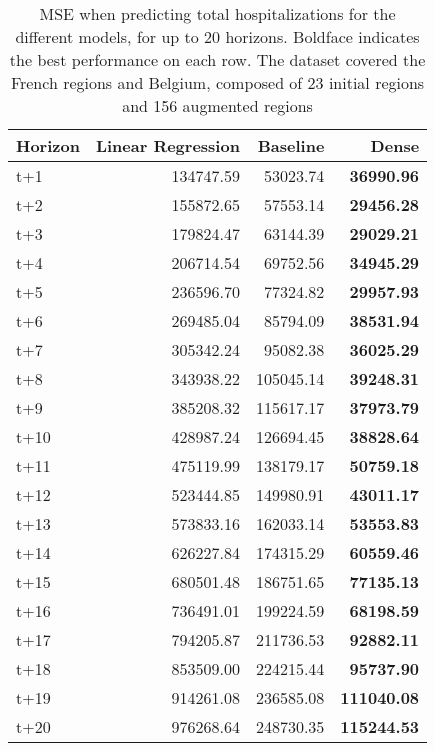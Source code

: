 \begin{table}[H]
\centering
\caption{MSE when predicting total hospitalizations for the different models, for up to 20 horizons. Boldface indicates the best performance on each row. The dataset covered the French regions and Belgium, composed of 23 initial regions and 156 augmented regions }
\label{tab:MSE_comparison}
\begin{tabular}{lrrr}
\toprule
Horizon &  Linear Regression &  Baseline &     Dense \\
\midrule
t+1  & 134747.59  & 53023.74  & \textbf{36990.96}  \\
t+2  & 155872.65  & 57553.14  & \textbf{29456.28}  \\
t+3  & 179824.47  & 63144.39  & \textbf{29029.21}  \\
t+4  & 206714.54  & 69752.56  & \textbf{34945.29}  \\
t+5  & 236596.70  & 77324.82  & \textbf{29957.93}  \\
t+6  & 269485.04  & 85794.09  & \textbf{38531.94}  \\
t+7  & 305342.24  & 95082.38  & \textbf{36025.29}  \\
t+8  & 343938.22  & 105045.14  & \textbf{39248.31}  \\
t+9  & 385208.32  & 115617.17  & \textbf{37973.79}  \\
t+10  & 428987.24  & 126694.45  & \textbf{38828.64}  \\
t+11  & 475119.99  & 138179.17  & \textbf{50759.18}  \\
t+12  & 523444.85  & 149980.91  & \textbf{43011.17}  \\
t+13  & 573833.16  & 162033.14  & \textbf{53553.83}  \\
t+14  & 626227.84  & 174315.29  & \textbf{60559.46}  \\
t+15  & 680501.48  & 186751.65  & \textbf{77135.13}  \\
t+16  & 736491.01  & 199224.59  & \textbf{68198.59}  \\
t+17  & 794205.87  & 211736.53  & \textbf{92882.11}  \\
t+18  & 853509.00  & 224215.44  & \textbf{95737.90}  \\
t+19  & 914261.08  & 236585.08  & \textbf{111040.08}  \\
t+20  & 976268.64  & 248730.35  & \textbf{115244.53}  \\

\bottomrule
\end{tabular}
\end{table}

